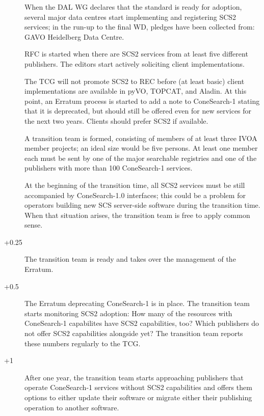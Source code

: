 \documentclass[11pt,a4paper]{ivoa}
\begin{document}
\begin{description}
\item[] When the DAL WG declares that the standard is ready
for adoption, several major data centres start implementing and
registering SCS2 services; in the run-up to the final WD, pledges have
been collected from: GAVO Heidelberg Data
Centre.

\item[] RFC is started when there are SCS2 services from at
least five different publishers.  The editors start actively soliciting
client implementations.

\item[] The TCG will not promote SCS2 to REC before (at least
basic) client implementations are available in pyVO, TOPCAT, and Aladin.
At this point, an Erratum process is started to add a note to
ConeSearch-1 stating that it is deprecated, but should still be offered
even for new services for the next two years.  Clients should prefer
SCS2 if available.

A transition team is formed, consisting of members of at least three
IVOA member projects; an ideal size would be five persons.  At least one
member each must be sent by one of the major searchable registries and
one of the publishers with more than 100 ConeSearch-1 services.

At the beginning of the transition time, all SCS2 services must be still
accompanied by ConeSearch-1.0 interfaces; this could be a problem for
operators building new SCS server-side software during the transition time.
When that situation arises, the transition team is free to apply common
sense.

\item[+0.25] The transition team is ready and takes over the
management of the Erratum.

\item[+0.5] The Erratum deprecating ConeSearch-1 is in place.  The
transition team starts monitoring SCS2 adoption: How many of the
resources with ConeSearch-1 capabilites have SCS2 capabilities, too?
Which publishers do not offer SCS2 capabilities alongside yet?  The
transition team reports these numbers regularly to the TCG.

\item[+1]  After one year, the transition team starts
approaching publishers that operate ConeSearch-1 services without SCS2
capabilities and offers them options to either update their software or
migrate either their publishing operation to another software.


\end{description}
\end{document}
